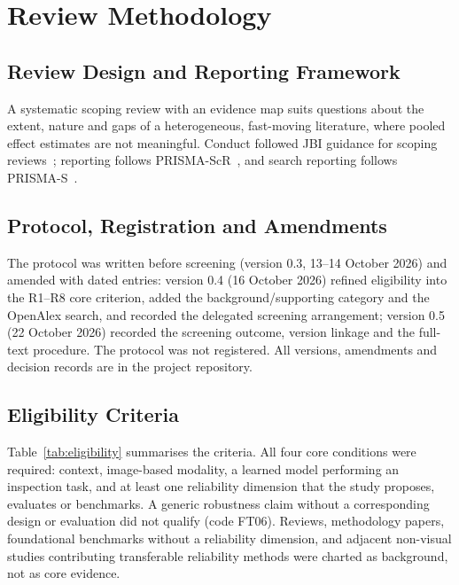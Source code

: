 \documentclass[journal]{IEEEtran}
\begin{document}
\section{Review Methodology}
\label{sec:methods}

\subsection{Review Design and Reporting Framework}
A systematic scoping review with an evidence map suits questions about the extent, nature and gaps of a heterogeneous, fast-moving literature, where pooled effect estimates are not meaningful. Conduct followed JBI guidance for scoping reviews~\cite{peters2020updated}; reporting follows PRISMA-ScR~\cite{tricco2018prisma}, and search reporting follows PRISMA-S~\cite{rethlefsen2021prisma}.

\subsection{Protocol, Registration and Amendments}
The protocol was written before screening (version 0.3, 13--14 October 2026) and amended with dated entries: version 0.4 (16 October 2026) refined eligibility into the R1--R8 core criterion, added the background/supporting category and the OpenAlex search, and recorded the delegated screening arrangement; version 0.5 (22 October 2026) recorded the screening outcome, version linkage and the full-text procedure. The protocol was not registered. All versions, amendments and decision records are in the project repository.

\subsection{Eligibility Criteria}
Table~\ref{tab:eligibility} summarises the criteria. All four core conditions were required: context, image-based modality, a learned model performing an inspection task, and at least one reliability dimension that the study proposes, evaluates or benchmarks. A generic robustness claim without a corresponding design or evaluation did not qualify (code FT06). Reviews, methodology papers, foundational benchmarks without a reliability dimension, and adjacent non-visual studies contributing transferable reliability methods were charted as background, not as core evidence.
\end{document}
